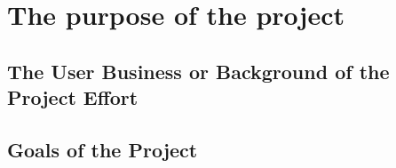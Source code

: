 \section{The purpose of the project}
\subsection{The User Business or Background of the Project Effort}
\subsection{Goals of the Project}